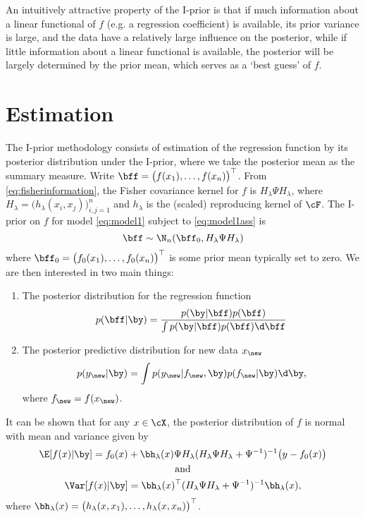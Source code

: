 An intuitively attractive property of the I-prior is that if much information about a linear functional of $f$ (e.g. a regression coefficient) is available, its prior variance is large, and the data have a relatively large influence on the posterior, while if little information about a linear functional is available, the posterior will be largely determined by the prior mean, which serves as a `best guess' of $f$. 


\section{Estimation}


The I-prior methodology consists of estimation of the regression function by its posterior distribution under the I-prior, where we take the posterior mean as the summary measure. 
Write $\bff = \big(f(x_1), \dots, f(x_n)\big)^\top$. 
From \eqref{eq:fisherinformation}, the Fisher covariance kernel for $f$ is $H_\lambda \Psi H_\lambda$, where $H_\lambda = \big( h_\lambda(x_i,x_j) \big)_{i,j=1}^n$ and $h_\lambda$ is the (scaled) reproducing kernel of $\cF$.
The I-prior on $f$ for model \eqref{eq:model1} subject to \eqref{eq:model1ass} is
\[
  \bff \sim \N_n(\bff_0, H_\lambda \Psi H_\lambda)
\]
where $\bff_0 = \big(f_0(x_1), \dots, f_0(x_n)\big)^\top$ is some prior mean typically set to zero. 
We are then interested in two main things:
\begin{enumerate}
  \item The posterior distribution for the regression function
  \[
    p(\bff|\by) = \frac{p(\by|\bff)p(\bff)}{\int p(\by|\bff)p(\bff) \d \bff}
  \]
  \item The posterior predictive distribution for new data $x_\new$
  \[
    p(y_\new|\by) = \int p(y_\new|f_\new,\by) p(f_\new|\by) \d \by,
  \]
  where $f_\new = f(x_\new)$.
\end{enumerate}
It can be shown that for any $x \in \cX$, the posterior distribution of $f$ is normal with mean and variance given by
\begin{gather*}
  \E[f(x)|\by] = f_0(x) + \bh_\lambda(x)\Psi H_\lambda(H_\lambda\Psi H_\lambda + \Psi^{-1})^{-1}\big(y - f_0(x)\big) \\
  \text{and} \\
  \Var[f(x)|\by] = \bh_\lambda(x)^\top (H_\lambda\Psi H_\lambda + \Psi^{-1})^{-1} \bh_\lambda(x),
\end{gather*}
where $\bh_\lambda(x) = \big(h_\lambda(x, x_1), \dots, h_\lambda(x, x_n)\big)^\top$.


